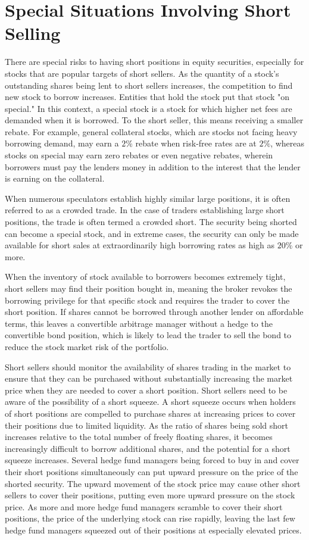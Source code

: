\documentclass[11pt]{article}
\begin{document}
\section*{Special Situations Involving Short Selling}
There are special risks to having short positions in equity securities, especially for stocks that are popular targets of short sellers. As the quantity of a stock's outstanding shares being lent to short sellers increases, the competition to find new stock to borrow increases. Entities that hold the stock put that stock "on special." In this context, a special stock is a stock for which higher net fees are demanded when it is borrowed. To the short seller, this means receiving a smaller rebate. For example, general collateral stocks, which are stocks not facing heavy borrowing demand, may earn a $2 \%$ rebate when risk-free rates are at $2 \%$, whereas stocks on special may earn zero rebates or even negative rebates, wherein borrowers must pay the lenders money in addition to the interest that the lender is earning on the collateral.

When numerous speculators establish highly similar large positions, it is often referred to as a crowded trade. In the case of traders establishing large short positions, the trade is often termed a crowded short. The security being shorted can become a special stock, and in extreme cases, the security can only be made available for short sales at extraordinarily high borrowing rates as high as $20 \%$ or more.

When the inventory of stock available to borrowers becomes extremely tight, short sellers may find their position bought in, meaning the broker revokes the borrowing privilege for that specific stock and requires the trader to cover the short position. If shares cannot be borrowed through another lender on affordable terms, this leaves a convertible arbitrage manager without a hedge to the convertible bond position, which is likely to lead the trader to sell the bond to reduce the stock market risk of the portfolio.

Short sellers should monitor the availability of shares trading in the market to ensure that they can be purchased without substantially increasing the market price when they are needed to cover a short position. Short sellers need to be aware of the possibility of a short squeeze. A short squeeze occurs when holders of short positions are compelled to purchase shares at increasing prices to cover their positions due to limited liquidity. As the ratio of shares being sold short increases relative to the total number of freely floating shares, it becomes increasingly difficult to borrow additional shares, and the potential for a short squeeze increases. Several hedge fund managers being forced to buy in and cover their short positions simultaneously can put upward pressure on the price of the shorted security. The upward movement of the stock price may cause other short sellers to cover their positions, putting even more upward pressure on the stock price. As more and more hedge fund managers scramble to cover their short positions, the price of the underlying stock can rise rapidly, leaving the last few hedge fund managers squeezed out of their positions at especially elevated prices.
\end{document}
